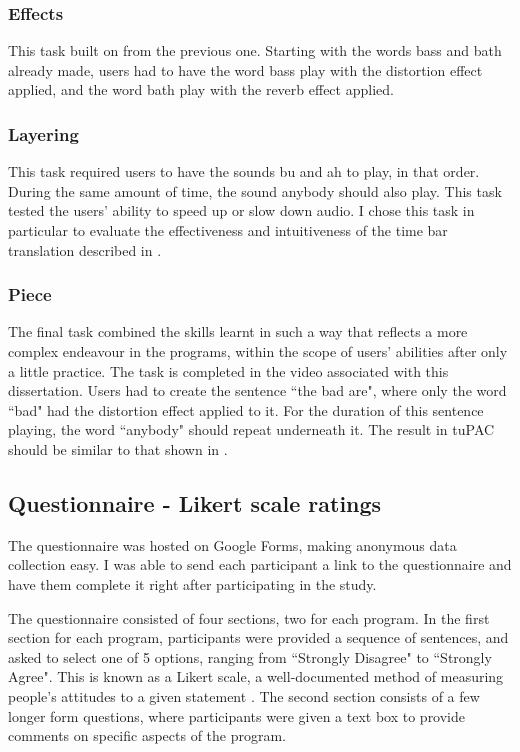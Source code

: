 \documentclass[12pt,a4paper,oneside,openright]{report}
\begin{document}
\subsubsection{Effects}
This task built on from the previous one. Starting with the words bass and bath already made, users had to have the word bass play with the distortion effect applied, and the word bath play with the reverb effect applied.

\subsubsection{Layering}
This task required users to have the sounds bu and ah to play, in that order. During the same amount of time, the sound anybody should also play. This task tested the users' ability to speed up or slow down audio. I chose this task in particular to evaluate the effectiveness and intuitiveness of the time bar translation described in .

\subsubsection{Piece}
The final task combined the skills learnt in such a way that reflects a more complex endeavour in the programs, within the scope of users' abilities after only a little practice. The task is completed in the video associated with this dissertation. Users had to create the sentence ``the bad are", where only the word ``bad" had the distortion effect applied to it. For the duration of this sentence playing, the word ``anybody" should repeat underneath it. The result in tuPAC should be similar to that shown in .

\subsection{Questionnaire - Likert scale ratings}
The questionnaire was hosted on Google Forms, making anonymous data collection easy. I was able to send each participant a link to the questionnaire and have them complete it right after participating in the study.

The questionnaire consisted of four sections, two for each program. In the first section for each program, participants were provided a sequence of sentences, and asked to select one of 5 options, ranging from ``Strongly Disagree" to ``Strongly Agree". This is known as a Likert scale, a well-documented method of measuring people's attitudes to a given statement \cite{Likert32}. The second section consists of a few longer form questions, where participants were given a text box to provide comments on specific aspects of the program.
\end{document}
